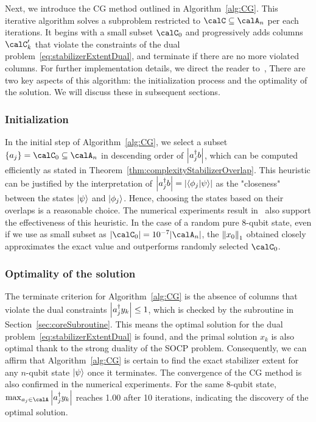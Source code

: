\documentclass[a4paper, onecolumn, 11pt, longbibliography]{quantumarticle}
\begin{document}
Next, we introduce the CG method
outlined in Algorithm~\ref{alg:CG}.
This iterative algorithm solves
a subproblem restricted to $\calC \subseteq \calA_n$
per each iterations.
It begins with a small subset $\calC_0$
and progressively adds columns $\calC'_k$
that violate the constraints of the dual problem~\eqref{eq:stabilizerExtentDual},
and terminate if there are no more violated columns.
For further implementation details,
we direct the reader
to~\cite{hamaguchiHandbookEfficientlyQuantifying2023},
There are two key aspects of this algorithm:
the initialization process and
the optimality of the solution.
We will discuss these
in subsequent sections.

\subsubsection{Initialization}

In the initial step of Algorithm~\ref{alg:CG},
we select a subset $\{a_j\} = \calC_0 \subseteq \calA_n$
in descending order of $\abs{a_j^\dagger b}$,
which can be computed efficiently
as stated in Theorem~\ref{thm:complexityStabilizerOverlap}.
This heuristic can be justified
by the interpretation of
$\abs{a_j^\dagger b} = \abs{\braket{\phi_j}{\psi}}$
as the "closeness" between the states
$\ket{\psi}$ and $\ket{\phi_j}$.
Hence, choosing the states based on their overlaps
is a reasonable choice.
The numerical experiments result
in~\cite{hamaguchiHandbookEfficientlyQuantifying2023}
also support the effectiveness of this heuristic.
In the case of a random pure 8-qubit state,
even if we use as small subset as $\abs{\calC_0} = 10^{-7} \abs{\calA_n}$,
the $\norm{x_0}_1$ obtained closely approximates the exact value
and outperforms randomly selected $\calC_0$.

\subsubsection{Optimality of the solution}

The terminate criterion for Algorithm~\ref{alg:CG}
is the absence of columns that violate
the dual constraints $\abs{a_j^\dagger y_k} \leq 1$,
which is checked by the subroutine in Section~\ref{sec:coreSubroutine}.
This means the optimal solution for the
dual problem~\eqref{eq:stabilizerExtentDual}
is found, and the primal solution $x_k$ is also optimal
thank to the strong duality of the SOCP problem.
Consequently, we can affirm that
Algorithm~\ref{alg:CG} is certain to
find the exact stabilizer extent
for any $n$-qubit state $\ket{\psi}$
once it terminates.
The convergence of the CG method
is also confirmed in the numerical experiments.
For the same 8-qubit state,
$\max_{a_j \in \calA} \abs{a_j^\dagger y_k}$
reaches 1.00 after 10 iterations,
indicating the discovery of the optimal solution.
\end{document}

